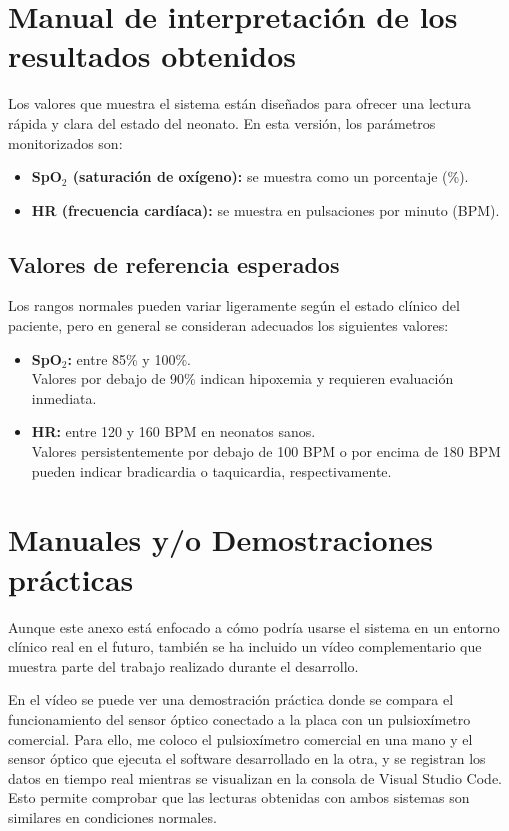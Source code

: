 \section{Manual de interpretación de los resultados obtenidos}

Los valores que muestra el sistema están diseñados para ofrecer una lectura rápida y clara del estado del neonato. En esta versión, los parámetros monitorizados son:

\begin{itemize}
    \item \textbf{SpO$_2$ (saturación de oxígeno):} se muestra como un porcentaje (\%).
    \item \textbf{HR (frecuencia cardíaca):} se muestra en pulsaciones por minuto (BPM).
\end{itemize}

\subsection{Valores de referencia esperados}

Los rangos normales pueden variar ligeramente según el estado clínico del paciente, pero en general se consideran adecuados los siguientes valores:

\begin{itemize}
    \item \textbf{SpO$_2$:} entre 85\% y 100\%. \\
    Valores por debajo de 90\% indican hipoxemia y requieren evaluación inmediata.
    
    \item \textbf{HR:} entre 120 y 160 BPM en neonatos sanos. \\
    Valores persistentemente por debajo de 100 BPM o por encima de 180 BPM pueden indicar bradicardia o taquicardia, respectivamente.
\end{itemize}


\section{Manuales y/o Demostraciones prácticas}

Aunque este anexo está enfocado a cómo podría usarse el sistema en un entorno clínico real en el futuro, también se ha incluido un vídeo complementario que muestra parte del trabajo realizado durante el desarrollo.

En el vídeo se puede ver una demostración práctica donde se compara el funcionamiento del sensor óptico conectado a la placa con un pulsioxímetro comercial. Para ello, me coloco el pulsioxímetro comercial en una mano y el sensor óptico que ejecuta el software desarrollado en la otra, y se registran los datos en tiempo real mientras se visualizan en la consola de Visual Studio Code. Esto permite comprobar que las lecturas obtenidas con ambos sistemas son similares en condiciones normales.

